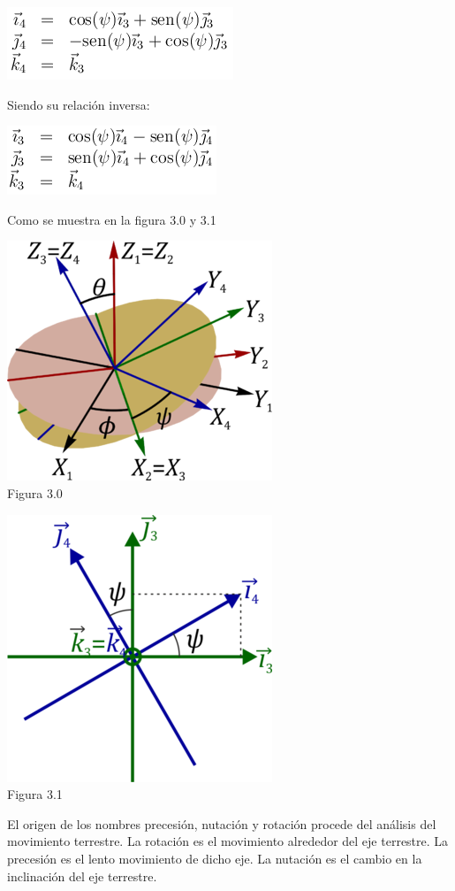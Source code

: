 \documentclass[11pt,a4paper,oldfontcommands,oneside]{memoir}
\begin{document}
\begin{center}
\includegraphics[scale=1.5]{5.png} 
\end{center}

Siendo su relación inversa:

\begin{center}
\includegraphics[scale=1.5]{6.png} 
\end{center}

Como se muestra en la figura 3.0 y 3.1
\begin{center}
\includegraphics[scale=2.5]{x.png} 
\\
Figura 3.0
\end{center}
\begin{center}
\includegraphics[scale=2.5]{j.png} 
\\
Figura 3.1
\end{center}

El origen de los nombres precesión, nutación y rotación procede del análisis del movimiento terrestre. La rotación es el movimiento alrededor del eje terrestre. La precesión es el lento movimiento de dicho eje. La nutación es el cambio en la inclinación del eje terrestre.




\end{document}
